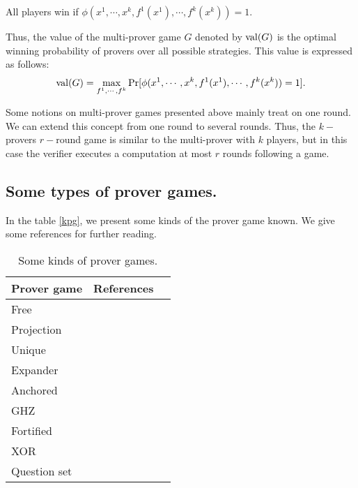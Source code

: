 All players win if $\phi (x^1, \cdots , x^k, f^1(x^1), \cdots , f^k(x^k))=1.$ 

Thus, the value of the multi-prover game $G$ denoted by $\mathrm{val} (G)$ is  the optimal winning probability of provers over all possible strategies. This value is expressed as follows:
$$\mathrm{val} (G)= \max_{f^1, \cdots , f^k} \Pr[\phi (x^1, \cdots , x^k, f^1(x^1), \cdots , f^k(x^k))=1].$$


Some notions on multi-prover games presented above  mainly treat on one round. We can extend this concept from one round to several rounds. Thus, the $k-$provers $r-$round game is similar to the multi-prover with $k$ players, but in this case the verifier executes a computation at most $r$ rounds following a game.


\subsection{Some types of prover games.}

In the table \eqref{kpg}, we present some kinds of the prover game known. We give some references for further reading.

\begin{table}[h]
\begin{center}
\begin{tabular}{lll}
\hline 
\textbf{Prover game} &  \textbf{References} \\ 
\hline 
Free & \cite{verbitsky1996towards} \\ Projection & \cite{rao2011parallel} \\ Unique &\cite{tamaki2015parallel}  \\ Expander & \cite{dinur2016multiplayer} \\ Anchored & \cite{bavarian2015anchoring} \\ GHZ & \cite{dinur2016multiplayer} \\ Fortified & \cite{moshkovitz2014parallel} \\ XOR & \cite{cleve2007perfect} \\ Question set & \cite{hkazla2016forbidden}\\
\hline 
\end{tabular} 
\end{center}
\caption{Some kinds of prover games.} \label{kpg}
\end{table}



